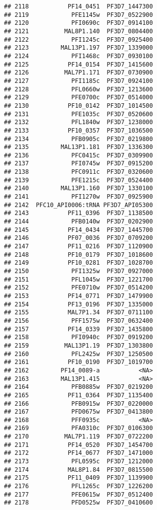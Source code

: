 \documentclass{article}\usepackage[]{graphicx}\usepackage[]{color}
\makeatletter
\newenvironment{kframe}{%
 \def\at@end@of@kframe{}%
 \ifinner\ifhmode%
  \def\at@end@of@kframe{\end{minipage}}%
  \begin{minipage}{\columnwidth}%
 \fi\fi%
 \def\FrameCommand##1{\hskip\@totalleftmargin \hskip-\fboxsep
 \colorbox{shadecolor}{##1}\hskip-\fboxsep
     \hskip-\linewidth \hskip-\@totalleftmargin \hskip\columnwidth}%
 \MakeFramed {\advance\hsize-\width
   \@totalleftmargin\z@ \linewidth\hsize
   \@setminipage}}%
 {\par\unskip\endMakeFramed%
 \at@end@of@kframe}
\newenvironment{knitrout}{}{} %
\makeatother
\begin{document}
\begin{knitrout}
\begin{kframe}
\begin{verbatim}
## 2118           PF14_0451  PF3D7_1447300
## 2119            PFE1145w  PF3D7_0522900
## 2120            PFI0690c  PF3D7_0914100
## 2121          MAL8P1.140  PF3D7_0804400
## 2122            PFI1245c  PF3D7_0925400
## 2123         MAL13P1.197  PF3D7_1339000
## 2124            PFI1468c  PF3D7_0930100
## 2125           PF14_0154  PF3D7_1415600
## 2126          MAL7P1.171  PF3D7_0730900
## 2127            PFI1185c  PF3D7_0924100
## 2128            PFL0660w  PF3D7_1213600
## 2129            PFE0700c  PF3D7_0514000
## 2130           PF10_0142  PF3D7_1014500
## 2131            PFE1035c  PF3D7_0520600
## 2132            PFL1840w  PF3D7_1238000
## 2133           PF10_0357  PF3D7_1036500
## 2134            PFB0905c  PF3D7_0219800
## 2135         MAL13P1.181  PF3D7_1336300
## 2136            PFC0415c  PF3D7_0309900
## 2137            PFI0745w  PF3D7_0915200
## 2138            PFC0911c  PF3D7_0320600
## 2139            PFE1215c  PF3D7_0524400
## 2140         MAL13P1.160  PF3D7_1330100
## 2141            PFI1270w  PF3D7_0925900
## 2142  PFC10_API0006:tRNA PF3D7_API05300
## 2143           PF11_0396  PF3D7_1138500
## 2144            PFB0140w  PF3D7_0202900
## 2145           PF14_0434  PF3D7_1445700
## 2146           PF07_0036  PF3D7_0709200
## 2147           PF11_0216  PF3D7_1120900
## 2148           PF10_0179  PF3D7_1018600
## 2149           PF10_0281  PF3D7_1028700
## 2150            PFI1325w  PF3D7_0927000
## 2151            PFL1045w  PF3D7_1221700
## 2152            PFE0710w  PF3D7_0514200
## 2153           PF14_0771  PF3D7_1479900
## 2154           PF13_0196  PF3D7_1335000
## 2155           MAL7P1.34  PF3D7_0711100
## 2156            PFF1575w  PF3D7_0632400
## 2157           PF14_0339  PF3D7_1435800
## 2158            PFI0940c  PF3D7_0919200
## 2159          MAL13P1.19  PF3D7_1303800
## 2160            PFL2425w  PF3D7_1250500
## 2161           PF10_0190  PF3D7_1019700
## 2162         PF14_0089-a           <NA>
## 2163         MAL13P1.415           <NA>
## 2164            PFB0885w  PF3D7_0219200
## 2165           PF11_0364  PF3D7_1135400
## 2166            PFB0915w  PF3D7_0220000
## 2167            PFD0675w  PF3D7_0413800
## 2168            PFF0935c           <NA>
## 2169            PFA0310c  PF3D7_0106300
## 2170          MAL7P1.119  PF3D7_0722200
## 2171           PF14_0520  PF3D7_1454700
## 2172           PF14_0677  PF3D7_1471000
## 2173            PFL0595c  PF3D7_1212000
## 2174           MAL8P1.84  PF3D7_0815500
## 2175           PF11_0409  PF3D7_1139900
## 2176            PFL1265c  PF3D7_1226200
## 2177            PFE0615w  PF3D7_0512400
## 2178            PFD0525w  PF3D7_0410600

\end{verbatim}
\end{kframe}
\end{knitrout}
\end{document}
